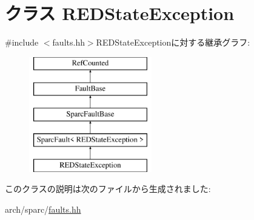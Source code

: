 \hypertarget{classSparcISA_1_1REDStateException}{
\section{クラス REDStateException}
\label{classSparcISA_1_1REDStateException}
}


{\ttfamily \#include $<$faults.hh$>$}REDStateExceptionに対する継承グラフ:\begin{figure}[H]
\begin{center}
\leavevmode
\includegraphics[height=5cm]{classSparcISA_1_1REDStateException}
\end{center}
\end{figure}


このクラスの説明は次のファイルから生成されました:\begin{DoxyCompactItemize}
\item 
arch/sparc/\hyperlink{arch_2sparc_2faults_8hh}{faults.hh}\end{DoxyCompactItemize}
